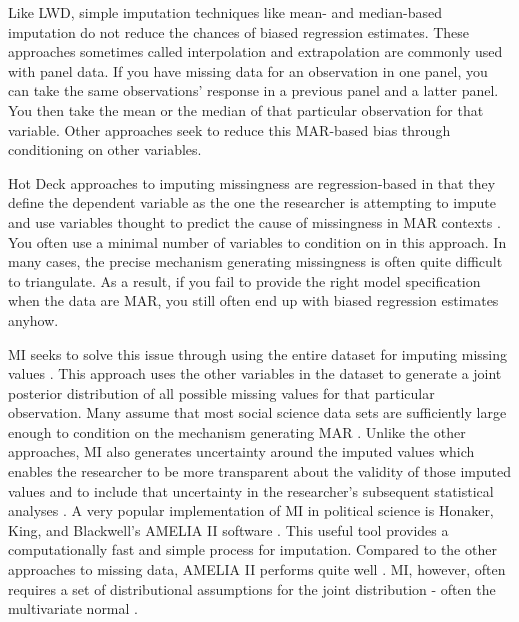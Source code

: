 \documentclass [12pt]{article}
\begin{document}
Like LWD, simple imputation techniques like mean- and median-based imputation do not reduce the chances of biased regression estimates. These approaches sometimes called interpolation and extrapolation are commonly used with panel data. If you have missing data for an observation in one panel, you can take the same observations' response in a previous panel and a latter panel. You then take the mean or the median of that particular observation for that variable. Other approaches seek to reduce this MAR-based bias through conditioning on other variables.

Hot Deck approaches to imputing missingness are regression-based in that they define the dependent variable as the one the researcher is attempting to impute and use variables thought to predict the cause of missingness in MAR contexts \citep{schunk_2008}. You often use a minimal number of variables to condition on in this approach. In many cases, the precise mechanism generating missingness is often quite difficult to triangulate. As a result, if you fail to provide the right model specification when the data are MAR, you still often end up with biased regression estimates anyhow. 

MI seeks to solve this issue through using the entire dataset for imputing missing values \citep{rubin_1996}. This approach uses the other variables in the dataset to generate a joint posterior distribution of all possible missing values for that particular observation. Many assume that most social science data sets are sufficiently large enough to condition on the mechanism generating MAR \citep{schunk_2008}. Unlike the other approaches, MI also generates uncertainty around the imputed values \citep{rubin_1996} which enables the researcher to be more transparent about the validity of those imputed values and to include that uncertainty in the researcher's subsequent statistical analyses \citep{king_et-al_2001, von-hippel_2015}. A very popular implementation of MI in political science is Honaker, King, and Blackwell's \citeyearpar{honaker_et-al_2011} AMELIA II software \citep{lall_2016}. This useful tool provides a computationally fast and simple process for imputation. Compared to the other approaches to missing data, AMELIA II performs quite well \citeyearpar{honaker_et-al_2011, kropko_et-al_2014}. MI, however, often requires a set of distributional assumptions for the joint distribution - often the multivariate normal \citep{honaker_et-al_2011}.
\end{document}
